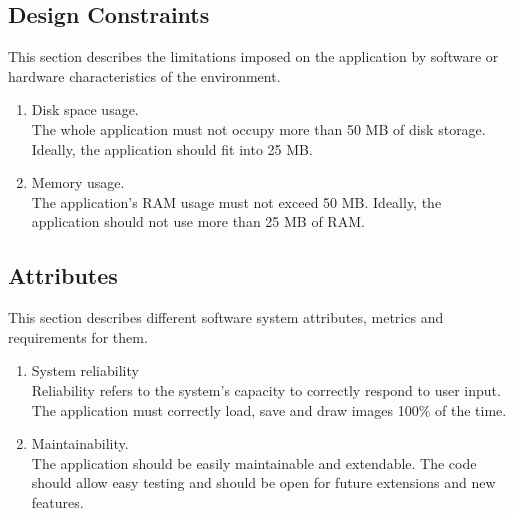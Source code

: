 \documentclass{article}
\begin{document}
\subsection{Design Constraints}
This section describes the limitations imposed on the application by software or hardware characteristics of the environment.
\begin{enumerate}
\item Disk space usage.
\\
The whole application must not occupy more than 50 MB of disk storage.
Ideally, the application should fit into 25 MB.
\item Memory usage.
\\
The application's RAM usage must not exceed 50 MB.
Ideally, the application should not use more than 25 MB of RAM.
\end{enumerate}

\subsection{Attributes}
This section describes different software system attributes, metrics and requirements for them.
\begin{enumerate}
\item System reliability
\\
Reliability refers to the system's capacity to correctly respond to user input.
The application must correctly load, save and draw images 100\% of the time.
\item Maintainability.
\\
The application should be easily maintainable and extendable.
The code should allow easy testing and should be open for future extensions and new features. 
\end{enumerate}
\end{document}
